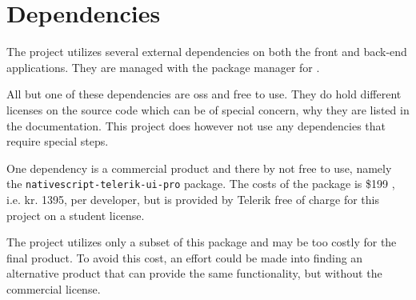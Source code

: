 \chapter{Dependencies}
\label{ch:dependencies}
The project utilizes several external dependencies on both the front and back-end applications.
They are managed with the package manager  for .

All but one of these dependencies are \gls{oss} and free to use.
They do hold different licenses on the source code which can be of special concern, why they are listed in the documentation. 
This project does however not use any dependencies that require special steps.

One dependency is a commercial product and there by not free to use, namely the \verb+nativescript-telerik-ui-pro+ package.
The costs of the package is \$199 \citep{dependencies:nativescript}, i.e. kr. 1395, per developer, but is provided by Telerik free of charge for this project on a student license.

The project utilizes only a subset of this package and may be too costly for the final product.
To avoid this cost, an effort could be made into finding an alternative product that can provide the same functionality, but without the commercial license.
